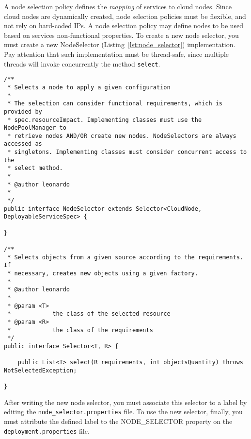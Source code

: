 A node selection policy defines the \emph{mapping} of services to cloud nodes.
Since cloud nodes are dynamically created, node selection policies must be flexible, and not rely on hard-coded IPs.
A node selection policy may define nodes to be used based on services non-functional properties.
To create a new node selector, you must create a new \textsf{NodeSelector} (Listing~\ref{lst:node_selector}) implementation.
Pay attention that such implementation must be thread-safe, since multiple threads will invoke concurrently the method \texttt{select}.

{\footnotesize
\begin{lstlisting}[caption=\textsf{NodeSelector} interface, label=lst:node_selector]
/**
 * Selects a node to apply a given configuration
 * 
 * The selection can consider functional requirements, which is provided by
 * spec.resourceImpact. Implementing classes must use the NodePoolManager to
 * retrieve nodes AND/OR create new nodes. NodeSelectors are always accessed as
 * singletons. Implementing classes must consider concurrent access to the
 * select method.
 * 
 * @author leonardo
 * 
 */
public interface NodeSelector extends Selector<CloudNode, DeployableServiceSpec> {

}

/**
 * Selects objects from a given source according to the requirements. If
 * necessary, creates new objects using a given factory.
 * 
 * @author leonardo
 * 
 * @param <T>
 *            the class of the selected resource
 * @param <R>
 *            the class of the requirements
 */
public interface Selector<T, R> {

    public List<T> select(R requirements, int objectsQuantity) throws NotSelectedException;

}
\end{lstlisting}
}

After writing the new node selector, you must associate this selector to a label by editing the \texttt{node\_selector.properties} file.
To use the new selector, finally, you must attribute the defined label to the NODE\_SELECTOR property on the \texttt{deployment.properties} file.







